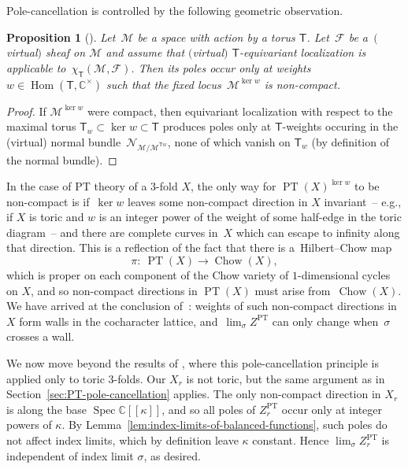 \documentclass[pdftex]{sigma}%
\numberwithin{equation}{section}
\newtheorem{Proposition}[Theorem]{Proposition}
\newcommand{\bC}{\mathbb{C}}
\newcommand{\cF}{\mathcal{F}}
\newcommand{\cM}{\mathcal{M}}
\newcommand{\cN}{\mathcal{N}}
\newcommand{\sT}{\mathsf{T}}
\DeclareMathOperator{\PT}{PT}
\DeclareMathOperator{\Chow}{Chow}
\DeclareMathOperator{\Hom}{Hom}
\DeclareMathOperator{\Spec}{Spec}
\begin{document}
\begin{MyParagraph}\label{sec:PT-pole-cancellation} Pole-cancellation is controlled by the following geometric observation.
\begin{Proposition}[{\cite[Proposition 3.2]{Arbesfeld2021}}] \label{prop:localization-poles}
 Let~$\cM$ be a space with action by a torus $\sT$. Let~$\cF$ be a~$($virtual$)$ sheaf on $\cM$ and assume that $($virtual$)$ $\sT$-equivariant
 localization is applicable to~$\chi_{\sT}(\cM, \cF)$. Then its poles
 occur only at weights $w \in \Hom(\sT, \bC^\times)$ such that the
 fixed locus~$\cM^{\ker w}$ is non-compact.
\end{Proposition}

\begin{proof}
 If $\cM^{\ker w}$ were compact, then equivariant localization with
 respect to the maximal torus $\sT_w \subset \ker w \subset \sT$
 produces poles only at $\sT$-weights occuring in the (virtual)
 normal bundle~$\cN_{\cM/\cM^{\sT w}}$, none of which vanish on
 $\sT_w$ (by definition of the normal bundle).
\end{proof}

In the case of PT theory of a $3$-fold $X$, the only way for
$\PT(X)^{\ker w}$ to be non-compact is if~$\ker w$ leaves some
non-compact direction in $X$ invariant~-- e.g., if $X$ is toric and
$w$ is an integer power of the weight of some half-edge in the toric
diagram~-- and there are complete curves in~$X$ which can escape to
infinity along that direction. This is a reflection of the fact that
there is a~Hilbert--Chow map
\[ \pi\colon \ \PT(X) \to \Chow(X), \]
which is proper on each component of the Chow variety of
$1$-dimensional cycles on $X$, and so non-compact directions in
$\PT(X)$ must arise from~$\Chow(X)$. We have arrived at the conclusion
of~\cite{Arbesfeld2021}: weights of such non-compact directions in~$X$
form walls in the cocharacter lattice, and~$\lim_\sigma Z^{\PT}$ can
only change when~$\sigma$ crosses a wall.
\end{MyParagraph}

\begin{MyParagraph}\label{sec:non-toric-gluings}
We now move beyond the results of \cite{Arbesfeld2021}, where this
pole-cancellation principle is applied only to toric $3$-folds. Our
$X_r$ is not toric, but the same argument as in
Section~\ref{sec:PT-pole-cancellation} applies. The only non-compact
direction in $X_r$ is along the base $\Spec \bC[[\kappa]]$, and so all
poles of $Z_r^{\PT}$ occur only at integer powers of $\kappa$. By
Lemma~\ref{lem:index-limits-of-balanced-functions}, such poles do not
affect index limits, which by definition leave $\kappa$ constant.
Hence $\lim_\sigma Z_r^{\PT}$ is independent of index limit $\sigma$,
as desired.
\end{MyParagraph}
\end{document}
